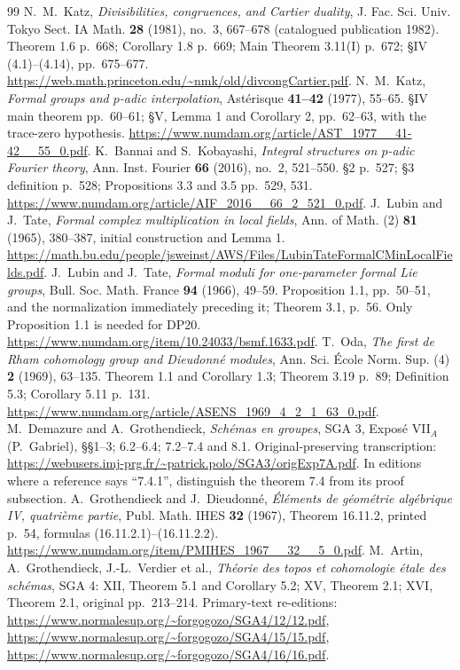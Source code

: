 \documentclass[11pt,a4paper]{article}
\theoremstyle{definition}\newtheorem{remark}[theorem]{Remark}
\begin{document}
\begin{thebibliography}{99}
 N.~M.~Katz, \emph{Divisibilities, congruences, and Cartier duality}, J. Fac. Sci. Univ. Tokyo Sect. IA Math. \textbf{28} (1981), no.~3, 667--678 (catalogued publication 1982). Theorem 1.6 p.~668; Corollary 1.8 p.~669; Main Theorem 3.11(I) p.~672; \S IV (4.1)--(4.14), pp.~675--677. \url{https://web.math.princeton.edu/~nmk/old/divcongCartier.pdf}.
 N.~M.~Katz, \emph{Formal groups and $p$-adic interpolation}, Ast\'erisque \textbf{41--42} (1977), 55--65. \S IV main theorem pp.~60--61; \S V, Lemma 1 and Corollary 2, pp.~62--63, with the trace-zero hypothesis. \url{https://www.numdam.org/article/AST_1977__41-42__55_0.pdf}.
 K.~Bannai and S.~Kobayashi, \emph{Integral structures on $p$-adic Fourier theory}, Ann. Inst. Fourier \textbf{66} (2016), no.~2, 521--550. \S2 p.~527; \S3 definition p.~528; Propositions 3.3 and 3.5 pp.~529, 531. \url{https://www.numdam.org/article/AIF_2016__66_2_521_0.pdf}.
 J.~Lubin and J.~Tate, \emph{Formal complex multiplication in local fields}, Ann. of Math. (2) \textbf{81} (1965), 380--387, initial construction and Lemma 1. \url{https://math.bu.edu/people/jsweinst/AWS/Files/LubinTateFormalCMinLocalFields.pdf}.
 J.~Lubin and J.~Tate, \emph{Formal moduli for one-parameter formal Lie groups}, Bull. Soc. Math. France \textbf{94} (1966), 49--59. Proposition 1.1, pp.~50--51, and the normalization immediately preceding it; Theorem 3.1, p.~56. Only Proposition 1.1 is needed for DP20. \url{https://www.numdam.org/item/10.24033/bsmf.1633.pdf}.
 T.~Oda, \emph{The first de Rham cohomology group and Dieudonn\'e modules}, Ann. Sci. \'Ecole Norm. Sup. (4) \textbf{2} (1969), 63--135. Theorem 1.1 and Corollary 1.3; Theorem 3.19 p.~89; Definition 5.3; Corollary 5.11 p.~131. \url{https://www.numdam.org/article/ASENS_1969_4_2_1_63_0.pdf}.
 M.~Demazure and A.~Grothendieck, \emph{Sch\'emas en groupes}, SGA 3, Expos\'e VII$_A$ (P.~Gabriel), \S\S1--3; 6.2--6.4; 7.2--7.4 and 8.1. Original-preserving transcription: \url{https://webusers.imj-prg.fr/~patrick.polo/SGA3/origExp7A.pdf}. In editions where a reference says ``7.4.1'', distinguish the theorem 7.4 from its proof subsection.
 A.~Grothendieck and J.~Dieudonn\'e, \emph{\'El\'ements de g\'eom\'etrie alg\'ebrique IV, quatri\`eme partie}, Publ. Math. IHES \textbf{32} (1967), Theorem 16.11.2, printed p.~54, formulas (16.11.2.1)--(16.11.2.2). \url{https://www.numdam.org/item/PMIHES_1967__32__5_0.pdf}.
 M.~Artin, A.~Grothendieck, J.-L.~Verdier et al., \emph{Th\'eorie des topos et cohomologie \'etale des sch\'emas}, SGA 4: XII, Theorem 5.1 and Corollary 5.2; XV, Theorem 2.1; XVI, Theorem 2.1, original pp.~213--214. Primary-text re-editions: \url{https://www.normalesup.org/~forgogozo/SGA4/12/12.pdf}, \url{https://www.normalesup.org/~forgogozo/SGA4/15/15.pdf}, \url{https://www.normalesup.org/~forgogozo/SGA4/16/16.pdf}.

\end{thebibliography}
\end{document}
